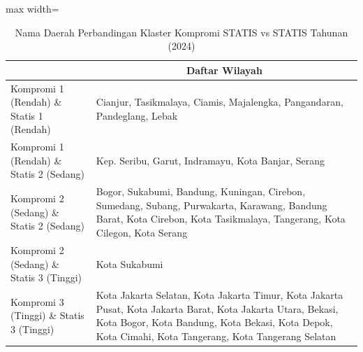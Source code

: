 \begin{table}[H]
\centering
\caption{Nama Daerah Perbandingan Klaster Kompromi STATIS vs STATIS Tahunan (2024)} \label{tab:app2comp_statis_name_2024}
\begin{adjustbox}{max width=\textwidth}
\begin{tabular}{|>{\centering\arraybackslash}p{4cm}|p{10cm}|}
\hline
\multicolumn{1}{|c|}{\textbf{Kategori}} & \multicolumn{1}{c|}{\textbf{Daftar Wilayah}} \\
\hline
Kompromi 1 (Rendah) \& Statis 1 (Rendah) & Cianjur, Tasikmalaya, Ciamis, Majalengka, Pangandaran, Pandeglang, Lebak \\
\hline
Kompromi 1 (Rendah) \& Statis 2 (Sedang) & Kep. Seribu, Garut, Indramayu, Kota Banjar, Serang \\
\hline
Kompromi 2 (Sedang) \& Statis 2 (Sedang) & Bogor, Sukabumi, Bandung, Kuningan, Cirebon, Sumedang, Subang, Purwakarta, Karawang, Bandung Barat, Kota Cirebon, Kota Tasikmalaya, Tangerang, Kota Cilegon, Kota Serang \\
\hline
Kompromi 2 (Sedang) \& Statis 3 (Tinggi) & Kota Sukabumi \\
\hline
Kompromi 3 (Tinggi) \& Statis 3 (Tinggi) & Kota Jakarta Selatan, Kota Jakarta Timur, Kota Jakarta Pusat, Kota Jakarta Barat, Kota Jakarta Utara, Bekasi, Kota Bogor, Kota Bandung, Kota Bekasi, Kota Depok, Kota Cimahi, Kota Tangerang, Kota Tangerang Selatan \\
\hline
\end{tabular}
\end{adjustbox}
\end{table}